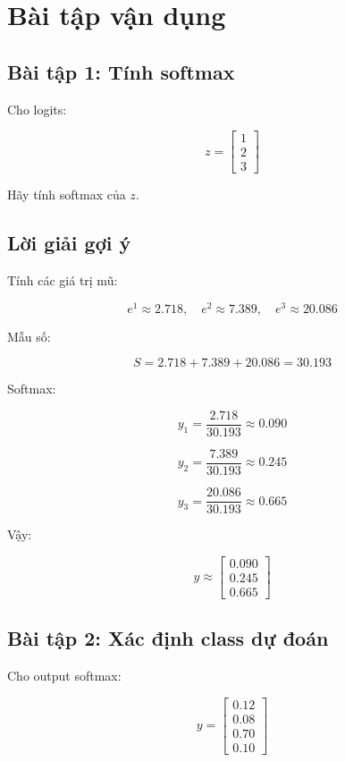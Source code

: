 \documentclass[12pt,a4paper]{report}
\begin{document}
\chapter{Bài tập vận dụng}

\section*{Bài tập 1: Tính softmax}

Cho logits:

\[
    z =
    \begin{bmatrix}
    1\\
    2\\
    3
    \end{bmatrix}
\]

Hãy tính softmax của $z$.

\section*{Lời giải gợi ý}

Tính các giá trị mũ:

\[
    e^1\approx 2.718,\quad
    e^2\approx 7.389,\quad
    e^3\approx 20.086
\]

Mẫu số:

\[
    S=2.718+7.389+20.086=30.193
\]

Softmax:

\[
    y_1=\frac{2.718}{30.193}\approx 0.090
\]

\[
    y_2=\frac{7.389}{30.193}\approx 0.245
\]

\[
    y_3=\frac{20.086}{30.193}\approx 0.665
\]

Vậy:

\[
    y\approx
    \begin{bmatrix}
    0.090\\
    0.245\\
    0.665
    \end{bmatrix}
\]

\section*{Bài tập 2: Xác định class dự đoán}

Cho output softmax:

\[
    y =
    \begin{bmatrix}
    0.12\\
    0.08\\
    0.70\\
    0.10
    \end{bmatrix}
\]
\end{document}
